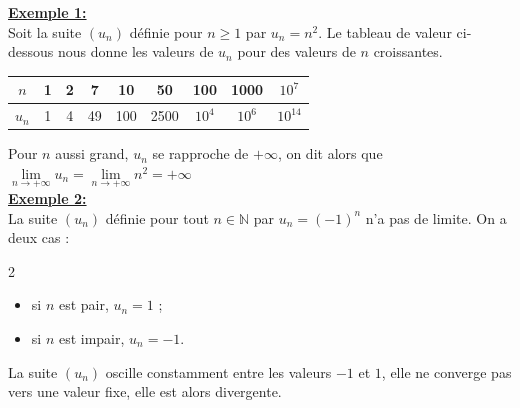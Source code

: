 \documentclass[11pt,twoside, openany]{extbook}
\begin{document}
\medskip


\noindent \textbf{\ul{Exemple 1:}}\\ Soit la suite $(u_n)$ définie pour $n\geqslant 1$ par $u_n=n^2$. Le tableau de valeur ci-dessous nous donne les valeurs de $u_n$ pour des valeurs de $n$ croissantes.
\begin{center}
{\renewcommand{\arraystretch}{0.9} %
{\setlength{\tabcolsep}{0.6cm} %
    \begin{tabular}{|c|c|c|c|c|c|c|c|c|}
\hline
$n$   & 1 & 2   & 7    & 10  & 50   & 100  & 1000  & $10^7$ \\ \hline
$u_n$ & 1 & 4 & 49 & 100 & 2500 & $10^4$ & $10^6$ & $10^{14}$ \\ \hline
\end{tabular}}} 
\end{center}
Pour $n$ aussi grand, $u_n$ se rapproche de $+\infty$, on dit alors que $\lim\limits_{n \rightarrow +\infty} u_n= \lim\limits_{n \rightarrow +\infty} n^2 =+\infty$\\
\medskip
\textbf{\ul{Exemple 2:}}\\La suite $(u_n)$ définie pour tout $n\in \mathbb{N}$ par $u_n=(-1)^n$ n'a pas de limite. On a deux cas :
\begin{multicols}{2}
   \begin{itemize}
\item si $n$ est pair, $u_n=1$ ;
\item si $n$ est impair, $u_n=-1$.
\end{itemize} 
\end{multicols}
La suite $(u_n)$ oscille constamment entre les valeurs $-1$ et $1$, elle ne converge pas vers une valeur fixe, elle est alors divergente.
\end{document}

